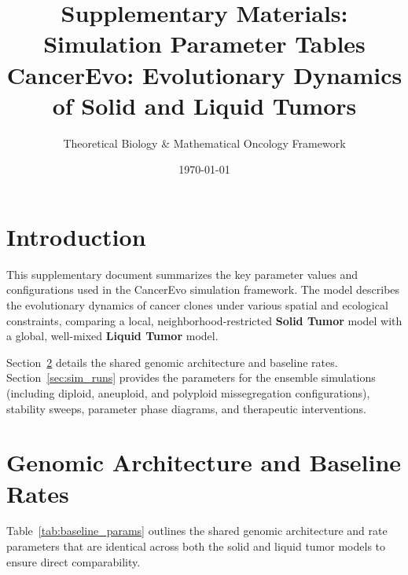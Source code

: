 \documentclass[11pt,a4paper]{article}
\title{Supplementary Materials: Simulation Parameter Tables \\ \large CancerEvo: Evolutionary Dynamics of Solid and Liquid Tumors}
\author{Theoretical Biology \& Mathematical Oncology Framework}
\date{\today}
\begin{document}
\maketitle

\section{Introduction}
This supplementary document summarizes the key parameter values and configurations used in the CancerEvo simulation framework. The model describes the evolutionary dynamics of cancer clones under various spatial and ecological constraints, comparing a local, neighborhood-restricted \textbf{Solid Tumor} model with a global, well-mixed \textbf{Liquid Tumor} model. 

Section~\ref{sec:baseline} details the shared genomic architecture and baseline rates. Section~\ref{sec:sim_runs} provides the parameters for the ensemble simulations (including diploid, aneuploid, and polyploid missegregation configurations), stability sweeps, parameter phase diagrams, and therapeutic interventions.

\clearpage

\section{Genomic Architecture and Baseline Rates}
\label{sec:baseline}

Table~\ref{tab:baseline_params} outlines the shared genomic architecture and rate parameters that are identical across both the solid and liquid tumor models to ensure direct comparability.
\end{document}
